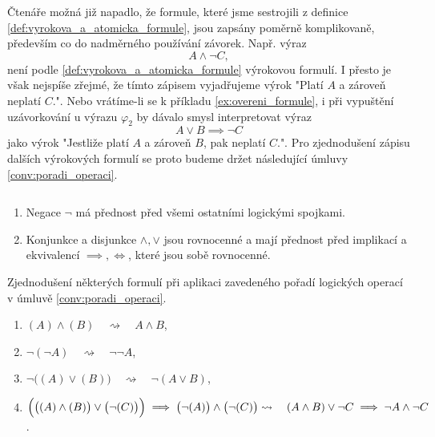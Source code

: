Čtenáře možná již napadlo, že formule, které jsme sestrojili z definice \ref{def:vyrokova_a_atomicka_formule}, jsou zapsány poměrně komplikovaně, především co do nadměrného používání závorek. Např. výraz
\begin{equation}\label{eq:poradi_operaci}
    A \land \neg C,
\end{equation}
není podle \ref{def:vyrokova_a_atomicka_formule} výrokovou formulí. I přesto je však nejspíše zřejmé, že tímto zápisem vyjadřujeme výrok "Platí $A$ a zároveň neplatí $C$.". Nebo vrátíme-li se k příkladu \ref{ex:overeni_formule}, i při vypuštění uzávorkování u výrazu $\varphi_2$ by dávalo smysl interpretovat výraz
\begin{equation*}\label{eq:vypusteni_uzavorkovani}
    A \lor B \implies \neg C
\end{equation*}
jako výrok "Jestliže platí $A$ a zároveň $B$, pak neplatí $C$.". Pro zjednodušení zápisu dalších výrokových formulí se proto budeme držet následující úmluvy \ref{conv:poradi_operaci}.
\begin{convention}
    \label{conv:poradi_operaci}
    $ $\par
    \begin{enumerate}[label=(\arabic*)]
        \item Negace $\neg$ má přednost před všemi ostatními logickými spojkami.
        \item Konjunkce a disjunkce $\land,\lor$ jsou rovnocenné a mají přednost před implikací a ekvivalencí $\implies,\iff$, které jsou sobě rovnocenné.
    \end{enumerate}
\end{convention}

\begin{example}
    Zjednodušení některých formulí při aplikaci zavedeného pořadí logických operací v úmluvě \ref{conv:poradi_operaci}.
    \begin{enumerate}[label=(\roman*)]
        \item $(A) \land (B)\quad\rightsquigarrow\quad A \land B$,
        \item $\neg(\neg A)\quad\rightsquigarrow\quad \neg\neg A$,
        \item $\neg \big((A) \lor (B)\big)\quad \rightsquigarrow\quad \neg(A \lor B)$,
        \item $\Big(\big((A) \land (B)\big) \lor \big(\neg (C)\big)\Big) \implies \big(\neg (A)\big) \land \big(\neg (C)\big)\\ \rightsquigarrow\quad(A \land B) \lor \neg C \implies \neg A \land \neg C$.
    \end{enumerate}
\end{example}

